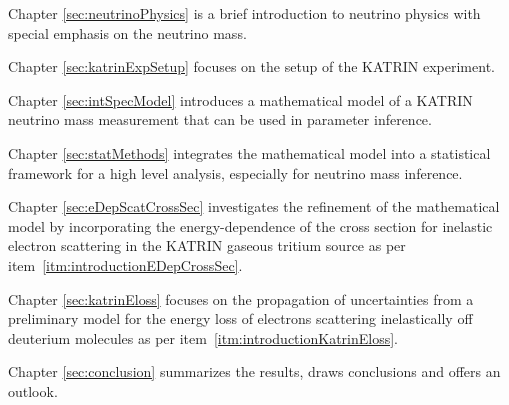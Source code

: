 Chapter \ref{sec:neutrinoPhysics} is a brief introduction to neutrino physics with special emphasis on the neutrino mass.

Chapter \ref{sec:katrinExpSetup} focuses on the setup of the KATRIN experiment.

Chapter \ref{sec:intSpecModel} introduces a mathematical model of a KATRIN neutrino mass measurement that can be used in parameter inference.

Chapter \ref{sec:statMethods} integrates the mathematical model into a statistical framework for a high level analysis, especially for neutrino mass inference.

Chapter \ref{sec:eDepScatCrossSec} investigates the refinement of the mathematical model by incorporating the energy-dependence of the cross section for inelastic electron scattering in the KATRIN gaseous tritium source as per item~\ref{itm:introductionEDepCrossSec}.

Chapter \ref{sec:katrinEloss} focuses on the propagation of uncertainties from a preliminary model for the energy loss of electrons scattering inelastically off deuterium molecules as per item~\ref{itm:introductionKatrinEloss}. 

Chapter \ref{sec:conclusion} summarizes the results, draws conclusions and offers an outlook.